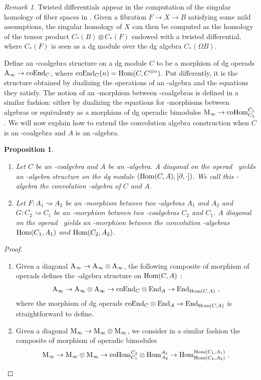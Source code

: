 \documentclass[twoside, 12pt]{amsart}
\newtheorem{proposition}[definition]{Proposition}
\theoremstyle{remark}
\newtheorem{remark}[definition]{\sc Remark}
\begin{document}
\begin{remark}
Twisted differentials appear in the computation of the singular homology of fiber spaces in \cite{Brown59}. 
Given a fibration $F \rightarrow X \rightarrow B$ satisfying some mild assumptions, the singular homology of $X$ can then be computed as the homology of the tensor product $C_*(B) \otimes C_*(F)$ endowed with a twisted differential, where $C_*(F)$ is seen as a dg module over the dg algebra $C_*(\Omega B)$.
\end{remark}

Define an \Ainf -coalgebra structure on a dg module $C$ to be a morphism of dg operads $\mathrm{A}_\infty \rightarrow \mathrm{coEnd}_C$, where $\mathrm{coEnd}_C(n) = \mathrm{Hom} ( C , C^{\otimes n} )$. 
Put differently, it is the structure obtained by dualizing the operations of an \Ainf -algebra and the equations they satisfy.
The notion of an \Ainf -morphism between \Ainf -coalgebras is defined in a similar fashion: either by dualizing the equations for \Ainf -morphisms between \Ainf algebras or equivalenty as a morphism of dg operadic bimodules $\mathrm{M}_\infty \rightarrow \mathrm{coHom}^{C_1}_{C_2}$.
We will now explain how to extend the convolution algebra construction when $C$ is an \Ainf -coalgebra and $A$ is an \Ainf -algebra.

\begin{proposition} 
\label{prop:convolution-ainf}
\begin{enumerate}[leftmargin=*,label=(\roman*)]
    \item Let $C$ be an \Ainf -coalgebra and $A$ be an \Ainf -algebra. 
A diagonal on the operad \Ainf\ yields an \Ainf -algebra structure on the dg module $(\mathrm{Hom} (C,A) , [ \partial , \cdot ])$. 
We call this \Ainf -algebra the \emph{convolution \Ainf -algebra of $C$ and $A$}.
\item Let $F : A_1 \rightsquigarrow A_2$ be an \Ainf -morphism between two \Ainf -algebras $A_1$ and $A_2$ and $G : C_2 \rightsquigarrow C_1$ be an \Ainf -morphism between two \Ainf -coalgebras $C_2$ and $C_1$. A diagonal on the operad \Minf\ yields  an \Ainf -morphism between the convolution \Ainf -algebras $\mathrm{Hom} (C_1,A_1)$ and $\mathrm{Hom} (C_2,A_2)$. 
\end{enumerate}
\end{proposition}

\begin{proof} 
\begin{enumerate}[leftmargin=*,label=(\roman*)]
\item Given a diagonal $\mathrm{A}_\infty \rightarrow \mathrm{A}_\infty \otimes \mathrm{A}_\infty$, the following composite of morphism of operads defines the \Ainf -algebra structure on $\mathrm{Hom}(C,A)$ : 
\[ \mathrm{A}_\infty \to \mathrm{A}_\infty \otimes \mathrm{A}_\infty \to \mathrm{coEnd}_C\otimes \mathrm{End}_A \to \mathrm{End}_{\mathrm{Hom}(C,A)} \ , \]
where the morphism of dg operads $\mathrm{coEnd}_C \otimes \mathrm{End}_A \to \mathrm{End}_{\mathrm{Hom}(C,A)}$ is straightforward to define.
\item Given a diagonal $\mathrm{M}_\infty \rightarrow \mathrm{M}_\infty \otimes \mathrm{M}_\infty$, we consider in a similar fashion the composite of morphism of operadic bimodules
\[ \mathrm{M}_\infty \to \mathrm{M}_\infty \otimes \mathrm{M}_\infty \to \mathrm{coHom}^{C_2}_{C_1} \otimes \mathrm{Hom}^{A_1}_{A_2} \to \mathrm{Hom}^{\mathrm{Hom}(C_1,A_1)}_{\mathrm{Hom}(C_2, A_2)} \ . \] 
\end{enumerate}
\end{proof}
\end{document}
